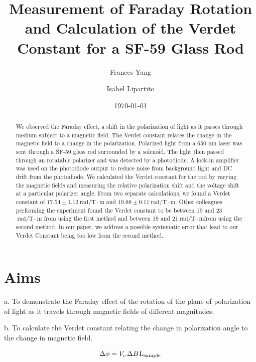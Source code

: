 \documentclass[prb,preprint]{revtex4-1}
\begin{document}
\title{Measurement of Faraday Rotation and Calculation of the Verdet Constant for a SF-59 Glass Rod}

\author{Frances Yang}

\author{Isabel Lipartito}

\date{\today}

\begin{abstract}
{We observed the Faraday effect, a shift in the polarization of light as it passes through medium subject to a magnetic field. The Verdet constant relates the change in the magnetic field to a change in the polarization.  Polarized light from a 650 nm laser was sent through a SF-59 glass rod surrounded by a solenoid. The light then passed through an rotatable polarizer and was detected by a photodiode. A lock-in amplifier was used on the photodiode output to reduce noise from background light and DC drift from the photodiode. We calculated the Verdet constant for the rod by varying the magnetic fields and measuring the relative polarization shift and the voltage shift at a particular polarizer angle. From two separate calculations, we found a Verdet constant of $17.54 \pm 1.12 \mathrm{~rad/T} \cdot \textrm{m}$ and $19.88 \pm 0.11 \mathrm{~rad/T} \cdot \textrm{m}$. Other colleagues performing the experiment found the Verdet constant to be between 19 and 23$\mathrm{~rad/T} \cdot \textrm{m}$ from using the first method and between 19 and 21$\mathrm{~rad/T} \cdot \textrm{m} $from using the second method.  In our paper, we address a possible systematic error that lead to our Verdet Constant being too low from the second method.

}
\end{abstract}

\maketitle 
\section{Aims}
{a.  To demonstrate the Faraday effect of the rotation of the plane of polarization of light as it travels through magnetic fields of different magnitudes.

b.  To calculate the Verdet constant relating the change in polarization angle to the change in magnetic field.}
\begin{equation}
\Delta \phi =V_{c}\hspace{1.5pt} \Delta B\hspace{1pt}\textrm{L}{_{\textrm{sample}}}
\end{equation}
\end{document}
